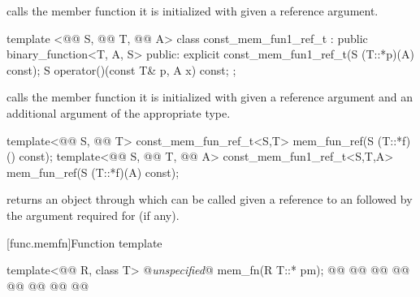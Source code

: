 \documentclass[american,twoside]{book}
\begin{document}
\begin{itemdescr}
\pnum
{} calls the member function it is initialized with
given a reference argument.
\end{itemdescr}

%
\begin{itemdecl}
template <@@ S, @@ T, @@ A> class const_mem_fun1_ref_t
      : public binary_function<T, A, S> {
public:
  explicit const_mem_fun1_ref_t(S (T::*p)(A) const);
  S operator()(const T& p, A x) const;
};
\end{itemdecl}

\begin{itemdescr}
\pnum
{} calls the member function it is initialized
with given a reference argument and an additional argument of the appropriate
type.
\end{itemdescr}

%
\begin{itemdecl}
template<@@ S, @@ T> const_mem_fun_ref_t<S,T>
   mem_fun_ref(S (T::*f)() const);
template<@@ S, @@ T, @@ A> const_mem_fun1_ref_t<S,T,A>
    mem_fun_ref(S (T::*f)(A) const);
\end{itemdecl}

\begin{itemdescr}
\pnum
{} returns an object through which 
can be called given a reference to an  followed by the argument
required for  (if any).
\end{itemdescr}

[func.memfn]{\marktr{}Function template }

%
\begin{itemdecl}
template<@@ R, class T> @\textit{unspecified}@ mem_fn(R T::* pm); 
@@
  @@
@@
  @@
@@
  @@
@@
  @@
\end{itemdecl}
\end{document}
